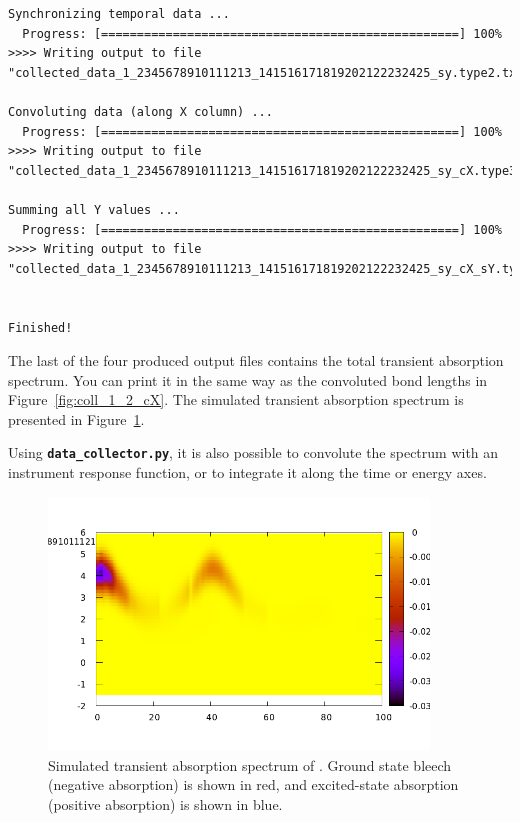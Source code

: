 \documentclass[a4paper,11pt,DIV=15,openany]{scrbook}
\newcommand{\ttt}[1]{\textbf{\texttt{#1}}}
\begin{document}
\begin{oframed}
\begin{Verbatim}[commandchars=\\\{\}]
Synchronizing temporal data ...
  Progress: [==================================================] 100%
>>>> Writing output to file "collected_data_1_2345678910111213_141516171819202122232425_sy.type2.txt"...

Convoluting data (along X column) ...
  Progress: [==================================================] 100%
>>>> Writing output to file "collected_data_1_2345678910111213_141516171819202122232425_sy_cX.type3.txt"...

Summing all Y values ...
  Progress: [==================================================] 100%
>>>> Writing output to file "collected_data_1_2345678910111213_141516171819202122232425_sy_cX_sY.type3.txt"...


Finished!
\end{Verbatim}
\end{oframed}

\normalsize
The last of the four produced output files contains the total transient absorption spectrum.
You can print it in the same way as the convoluted bond lengths in Figure~\ref{fig:coll_1_2_cX}.
The simulated transient absorption spectrum is presented in Figure~\ref{fig:TAS}.

Using \ttt{data\_collector.py}, it is also possible to convolute the spectrum with an instrument response function, or to integrate it along the time or energy axes.

\begin{figure}[h]
  \centering
  \includegraphics[width=0.9\textwidth]{figures/TAS.png}
  \caption{Simulated transient absorption spectrum of . Ground state bleech (negative absorption) is shown in red, and excited-state absorption (positive absorption) is shown in blue.}
  \label{fig:TAS}
\end{figure}
\end{document}
